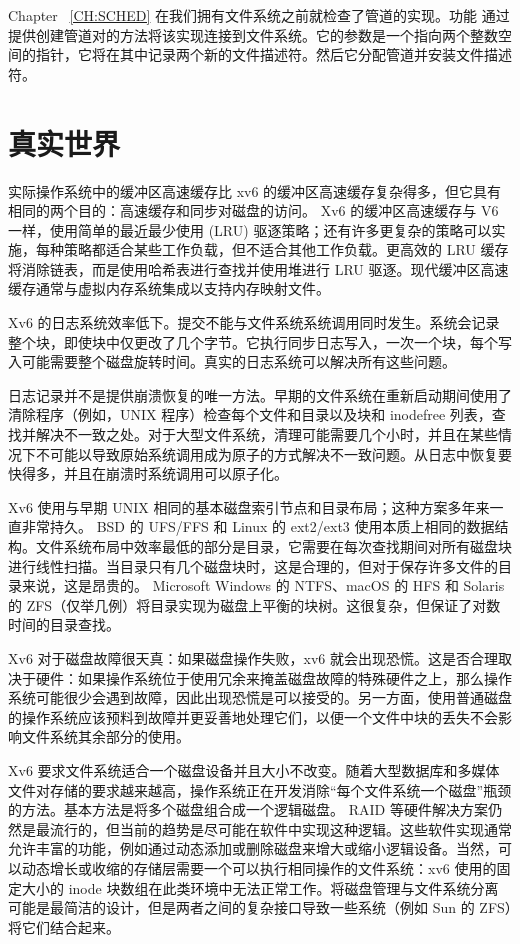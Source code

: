 \documentclass[UTF8]{article}
\begin{document}
Chapter~    \ref{CH:SCHED}    在我们拥有文件系统之前就检查了管道的实现。功能
        通过提供创建管道对的方法将该实现连接到文件系统。它的参数是一个指向两个整数空间的指针，它将在其中记录两个新的文件描述符。然后它分配管道并安装文件描述符。
    \section{真实世界  }     

实际操作系统中的缓冲区高速缓存比 xv6 的缓冲区高速缓存复杂得多，但它具有相同的两个目的：高速缓存和同步对磁盘的访问。 Xv6 的缓冲区高速缓存与 V6 一样，使用简单的最近最少使用 (LRU) 驱逐策略；还有许多更复杂的策略可以实施，每种策略都适合某些工作负载，但不适合其他工作负载。更高效的 LRU 缓存将消除链表，而是使用哈希表进行查找并使用堆进行 LRU 驱逐。现代缓冲区高速缓存通常与虚拟内存系统集成以支持内存映射文件。  

Xv6 的日志系统效率低下。提交不能与文件系统系统调用同时发生。系统会记录整个块，即使块中仅更改了几个字节。它执行同步日志写入，一次一个块，每个写入可能需要整个磁盘旋转时间。真实的日志系统可以解决所有这些问题。  

日志记录并不是提供崩溃恢复的唯一方法。早期的文件系统在重新启动期间使用了清除程序（例如，UNIX
        程序）检查每个文件和目录以及块和 inodefree 列表，查找并解决不一致之处。对于大型文件系统，清理可能需要几个小时，并且在某些情况下不可能以导致原始系统调用成为原子的方式解决不一致问题。从日志中恢复要快得多，并且在崩溃时系统调用可以原子化。  

Xv6 使用与早期 UNIX 相同的基本磁盘索引节点和目录布局；这种方案多年来一直非常持久。 BSD 的 UFS/FFS 和 Linux 的 ext2/ext3 使用本质上相同的数据结构。文件系统布局中效率最低的部分是目录，它需要在每次查找期间对所有磁盘块进行线性扫描。当目录只有几个磁盘块时，这是合理的，但对于保存许多文件的目录来说，这是昂贵的。 Microsoft Windows 的 NTFS、macOS 的 HFS 和 Solaris 的 ZFS（仅举几例）将目录实现为磁盘上平衡的块树。这很复杂，但保证了对数时间的目录查找。  

Xv6 对于磁盘故障很天真：如果磁盘操作失败，xv6 就会出现恐慌。这是否合理取决于硬件：如果操作系统位于使用冗余来掩盖磁盘故障的特殊硬件之上，那么操作系统可能很少会遇到故障，因此出现恐慌是可以接受的。另一方面，使用普通磁盘的操作系统应该预料到故障并更妥善地处理它们，以便一个文件中块的丢失不会影响文件系统其余部分的使用。  

Xv6 要求文件系统适合一个磁盘设备并且大小不改变。随着大型数据库和多媒体文件对存储的要求越来越高，操作系统正在开发消除“每个文件系统一个磁盘”瓶颈的方法。基本方法是将多个磁盘组合成一个逻辑磁盘。 RAID 等硬件解决方案仍然是最流行的，但当前的趋势是尽可能在软件中实现这种逻辑。这些软件实现通常允许丰富的功能，例如通过动态添加或删除磁盘来增大或缩小逻辑设备。当然，可以动态增长或收缩的存储层需要一个可以执行相同操作的文件系统：xv6 使用的固定大小的 inode 块数组在此类环境中无法正常工作。将磁盘管理与文件系统分离可能是最简洁的设计，但是两者之间的复杂接口导致一些系统（例如 Sun 的 ZFS）将它们结合起来。  
\end{document}
